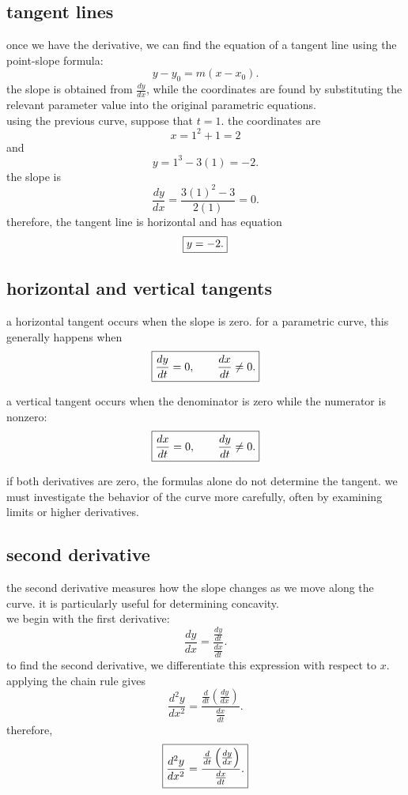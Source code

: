 \documentclass{article}
\newcommand{\mybox}[1]{\fbox{\ensuremath{\displaystyle #1}}}
\begin{document}
\subsection{tangent lines}

once we have the derivative, we can find the equation of a tangent line using the point-slope formula:
\[
y-y_0=m(x-x_0).
\]
the slope is obtained from $\frac{dy}{dx}$, while the coordinates are found by substituting the relevant parameter value into the original parametric equations.\\

using the previous curve, suppose that $t=1$. the coordinates are
\[
x=1^2+1=2
\]
and
\[
y=1^3-3(1)=-2.
\]
the slope is
\[
\frac{dy}{dx}
=
\frac{3(1)^2-3}{2(1)}
=0.
\]
therefore, the tangent line is horizontal and has equation
\[
\mybox{y=-2.}
\]

\subsection{horizontal and vertical tangents}

a horizontal tangent occurs when the slope is zero. for a parametric curve, this generally happens when
\[
\mybox{
\frac{dy}{dt}=0,\qquad
\frac{dx}{dt}\neq0.
}
\]

a vertical tangent occurs when the denominator is zero while the numerator is nonzero:
\[
\mybox{
\frac{dx}{dt}=0,\qquad
\frac{dy}{dt}\neq0.
}
\]

if both derivatives are zero, the formulas alone do not determine the tangent. we must investigate the behavior of the curve more carefully, often by examining limits or higher derivatives.\\

\subsection{second derivative}

the second derivative measures how the slope changes as we move along the curve. it is particularly useful for determining concavity.\\

we begin with the first derivative:
\[
\frac{dy}{dx}
=
\frac{\frac{dy}{dt}}{\frac{dx}{dt}}.
\]
to find the second derivative, we differentiate this expression with respect to $x$. applying the chain rule gives
\[
\frac{d^2y}{dx^2}
=
\frac{
\frac{d}{dt}\left(\frac{dy}{dx}\right)
}{
\frac{dx}{dt}
}.
\]
therefore,
\[
\mybox{
\frac{d^2y}{dx^2}
=
\frac{
\frac{d}{dt}\left(\frac{dy}{dx}\right)
}{
\frac{dx}{dt}
}.
}
\]
\end{document}
